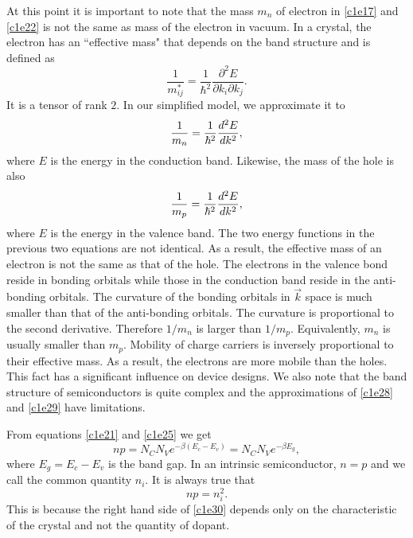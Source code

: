 At this point it is important to note that the mass $m_n$ of electron in 
\eqref{c1e17} and \eqref{c1e22} is not the same as mass of the electron in
vacuum. In a crystal, the electron has an ``effective mass" that depends on the
band structure and is defined as
\begin{equation}\label{c1e27}
\frac{1}{m^\ast_{ij}} = 
\frac{1}{\hbar^2}\frac{\partial^2 E}{\partial k_i\partial k_j}.
\end{equation}
It is a tensor of rank $2$. In our simplified model, we approximate it to
\begin{equation}\label{c1e28}
\frac{1}{m_n} = \frac{1}{\hbar^2}\frac{d^2{E}}{d{k}^2},
\end{equation}
where $E$ is the energy in the conduction band. Likewise, the mass of the hole
is also
\begin{equation}\label{c1e29}
\frac{1}{m_p} = \frac{1}{\hbar^2}\frac{d^2{E}}{d{k}^2},
\end{equation}
where $E$ is the energy in the valence band. The two energy functions in the
previous two equations are not identical. As a result, the effective mass of
an electron is not the same as that of the hole. The electrons in the valence 
bond reside in bonding orbitals while those in the conduction band reside in the
anti-bonding orbitals. The curvature of the bonding orbitals in $\vec{k}$ space 
is much smaller than that of the anti-bonding orbitals. The curvature is 
proportional to the second derivative. Therefore $1/m_n$ is larger than $1/m_p$.
Equivalently, $m_n$ is usually smaller than $m_p$. Mobility of charge carriers 
is inversely proportional to their effective mass. As a result, the electrons 
are more mobile than the holes. This fact has a significant influence on device 
designs. We also note that the band structure of semiconductors is quite 
complex and the approximations of \eqref{c1e28} and \eqref{c1e29} have 
limitations.

From equations \eqref{c1e21} and \eqref{c1e25} we get
\begin{equation}\label{c1e30}
np = N_CN_V e^{-\beta(E_c - E_v)} = N_CN_V e^{-\beta E_g},
\end{equation}
where $E_g = E_c - E_v$ is the band gap. In an intrinsic semiconductor, $n = p$
and we call the common quantity $n_i$. It is always true that
\begin{equation}\label{c1e31}
np = n_i^2.
\end{equation}
This is because the right hand side of \eqref{c1e30} depends only on the 
characteristic of the crystal and not the quantity of dopant.

